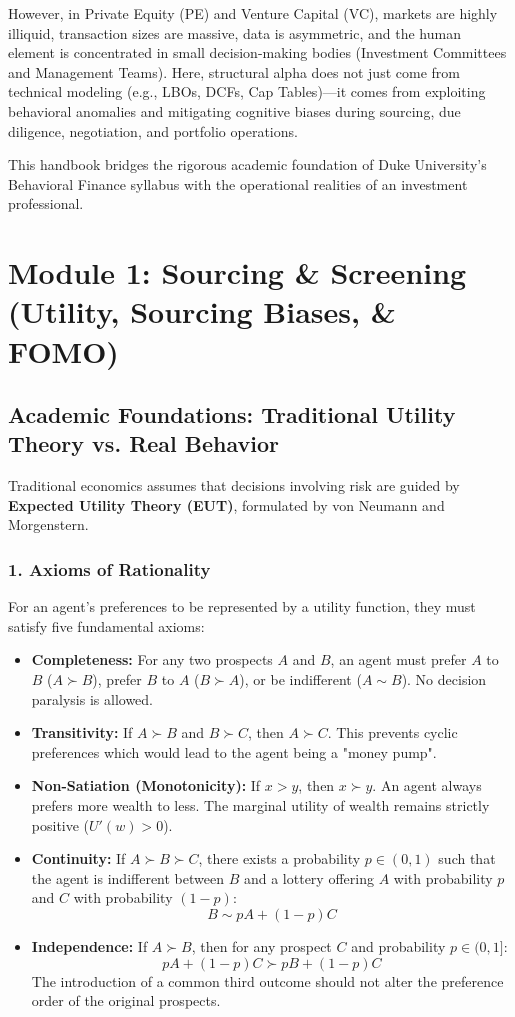 \documentclass[11pt,a4paper]{article}
\begin{document}
However, in Private Equity (PE) and Venture Capital (VC), markets are highly illiquid, transaction sizes are massive, data is asymmetric, and the human element is concentrated in small decision-making bodies (Investment Committees and Management Teams). Here, structural alpha does not just come from technical modeling (e.g., LBOs, DCFs, Cap Tables)---it comes from exploiting behavioral anomalies and mitigating cognitive biases during sourcing, due diligence, negotiation, and portfolio operations. 

This handbook bridges the rigorous academic foundation of Duke University's Behavioral Finance syllabus with the operational realities of an investment professional.

\newpage
\section{Module 1: Sourcing \& Screening (Utility, Sourcing Biases, \& FOMO)}

\subsection{Academic Foundations: Traditional Utility Theory vs. Real Behavior}
Traditional economics assumes that decisions involving risk are guided by \textbf{Expected Utility Theory (EUT)}, formulated by von Neumann and Morgenstern. 

\subsubsection{1. Axioms of Rationality}
For an agent's preferences to be represented by a utility function, they must satisfy five fundamental axioms:
\begin{itemize}
    \item \textbf{Completeness:} For any two prospects $A$ and $B$, an agent must prefer $A$ to $B$ ($A \succ B$), prefer $B$ to $A$ ($B \succ A$), or be indifferent ($A \sim B$). No decision paralysis is allowed.
    \item \textbf{Transitivity:} If $A \succ B$ and $B \succ C$, then $A \succ C$. This prevents cyclic preferences which would lead to the agent being a "money pump".
    \item \textbf{Non-Satiation (Monotonicity):} If $x > y$, then $x \succ y$. An agent always prefers more wealth to less. The marginal utility of wealth remains strictly positive ($U'(w) > 0$).
    \item \textbf{Continuity:} If $A \succ B \succ C$, there exists a probability $p \in (0, 1)$ such that the agent is indifferent between $B$ and a lottery offering $A$ with probability $p$ and $C$ with probability $(1-p)$:
    \[ B \sim pA + (1-p)C \]
    \item \textbf{Independence:} If $A \succ B$, then for any prospect $C$ and probability $p \in (0, 1]$:
    \[ pA + (1-p)C \succ pB + (1-p)C \]
    The introduction of a common third outcome should not alter the preference order of the original prospects.
\end{itemize}
\end{document}
